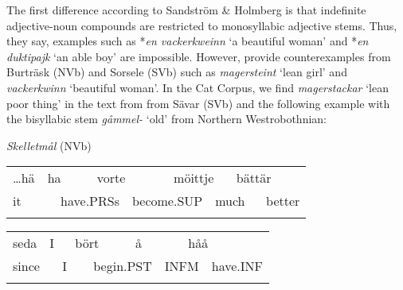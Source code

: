 \begin{styleBodytextC}
The first difference according to Sandström \& Holmberg is that indefinite adjective-noun compounds are restricted to monosyllabic adjective stems. Thus, they say, examples such as *\textit{en vackerkweinn }‘a beautiful woman’ and *\textit{en duktipajk }‘an able boy’ are impossible. However, \citet[47]{BergholmEtAl1999} provide counterexamples from Burträsk (NVb) and Sorsele (SVb) such as \textit{magersteint} ‘lean girl’ and \textit{vackerkwinn} ‘beautiful woman’. In the Cat Corpus, we find \textit{magerstackar} ‘lean poor thing’ in the text from from Sävar (SVb) and the following example with the bisyllabic stem \textit{gåmmel-} ‘old’ from Northern Westrobothnian:

\end{styleBodytextC}

\begin{listWWNumileveli}
\item 

\begin{styleExample}
\textit{Skelletmål} (NVb)

\end{styleExample}

\end{listWWNumileveli}

\begin{tabular}{llllllllll}
\lsptoprule
…hä & \multicolumn{2}{l}{ha

} & \multicolumn{2}{l}{vorte

} & \multicolumn{2}{l}{möittje

} & \multicolumn{2}{l}{bättär

} & \\
\multicolumn{2}{l}{it

} & \multicolumn{2}{l}{have.PRSs

} & \multicolumn{2}{l}{become.SUP

} & \multicolumn{2}{l}{much

} & \multicolumn{2}{l}{better

}\\
\lspbottomrule
\end{tabular}

\begin{tabular}{llllllllll}
\lsptoprule
seda & \multicolumn{2}{l}{I

} & \multicolumn{2}{l}{bört

} & \multicolumn{2}{l}{å

} & \multicolumn{2}{l}{håå

} & \\
\multicolumn{2}{l}{since

} & \multicolumn{2}{l}{I

} & \multicolumn{2}{l}{begin.PST

} & \multicolumn{2}{l}{INFM

} & \multicolumn{2}{l}{have.INF

}\\
\lspbottomrule
\end{tabular}

